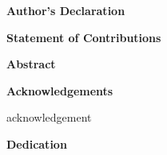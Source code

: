 \cleardoublepage
{}    %

 \begin{center}\textbf{Author's Declaration}\end{center}
 \declaration

\cleardoublepage
{}    %


  \begin{center}\textbf{Statement of Contributions}\end{center}
  \Statement
 
 \cleardoublepage


\begin{center}\textbf{Abstract}\end{center}
\abstract

\cleardoublepage
{}  

\begin{center}\textbf{Acknowledgements}\end{center}
acknowledgement

\cleardoublepage
{} 

\begin{center}\textbf{Dedication}\end{center}

\dedication

\cleardoublepage
{}  

\renewcommand\contentsname{Table of Contents}
\tableofcontents
\cleardoublepage
{}   



{}

